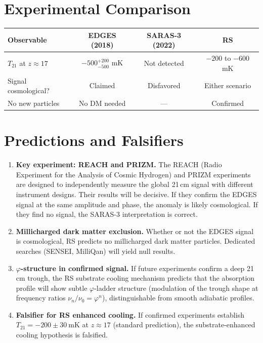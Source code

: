 \documentclass[12pt,a4paper]{article}
\theoremstyle{definition}
\theoremstyle{remark}
\begin{document}
\section{Experimental Comparison}
\label{sec:compare}

\begin{center}
\renewcommand{\arraystretch}{1.3}
\begin{tabular}{lccc}
\toprule
\textbf{Observable} & \textbf{EDGES (2018)} & \textbf{SARAS-3 (2022)} & \textbf{RS}\\
\midrule
$T_{21}$ at $z \approx 17$ & $-500^{+200}_{-500}$ mK & Not detected & $-200$ to $-600$ mK\\
Signal cosmological? & Claimed & Disfavored & Either scenario\\
No new particles & No DM needed & --- & Confirmed\\
\bottomrule
\end{tabular}
\end{center}

\section{Predictions and Falsifiers}
\label{sec:predict}

\begin{enumerate}
  \item \textbf{Key experiment: REACH and PRIZM.}  The REACH
  (Radio Experiment for the Analysis of Cosmic Hydrogen) and PRIZM
  experiments are designed to independently measure the global 21\,cm
  signal with different instrument designs.  Their results will be
  decisive.  If they confirm the EDGES signal at the same amplitude
  and phase, the anomaly is likely cosmological.  If they find no
  signal, the SARAS-3 interpretation is correct.

  \item \textbf{Millicharged dark matter exclusion.}  Whether or not
  the EDGES signal is cosmological, RS predicts no millicharged dark
  matter particles.  Dedicated searches (SENSEI, MilliQan) will yield
  null results.

  \item \textbf{$\varphi$-structure in confirmed signal.}  If
  future experiments confirm a deep 21\,cm trough, the RS substrate
  cooling mechanism predicts that the absorption profile will show
  subtle $\varphi$-ladder structure (modulation of the trough shape
  at frequency ratios $\nu_n/\nu_0 = \varphi^n$), distinguishable
  from smooth adiabatic profiles.

  \item \textbf{Falsifier for RS enhanced cooling.}  If confirmed
  experiments establish $T_{21} = -200 \pm 30~\mathrm{mK}$ at
  $z \approx 17$ (standard prediction), the substrate-enhanced cooling
  hypothesis is falsified.
\end{enumerate}
\end{document}
